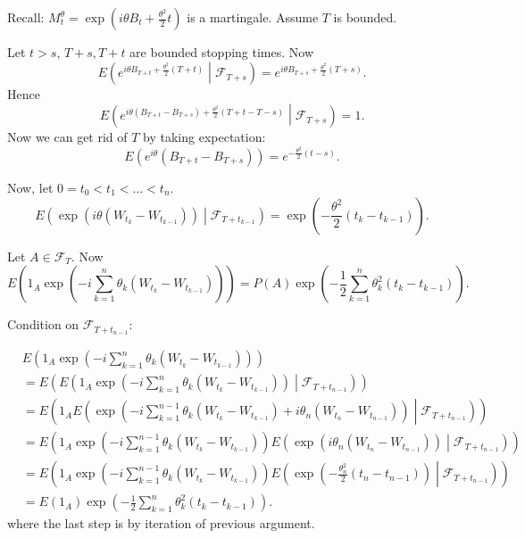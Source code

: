 Recall: $M_t^\theta = \exp\left( i \theta B_t + \frac{\theta^2}{2} t \right) $ is a martingale. Assume $T$ is bounded.

Let $t > s$,  $T+s, T+t$ are bounded stopping times. Now
\[
	E\left( e^{i \theta B_{T + t} + \frac{\theta^2}{2}(T + t)} \middle| \mathcal{F}_{T + s} \right) 
	= e^{i \theta B_{T + s} + \frac{\theta^2}{2} (T + s)}
.\] 
Hence
\[
	E\left( e^{i \theta (B_{T + t} - B_{T + s}) + \frac{\theta^2}{2}(T + t - T - s)} \middle| \mathcal{F}_{T + s} \right) =1
.\] 
Now we can get rid of $T$ by taking expectation:
\[
	E\left( e^{i \theta} \left( B_{T + t} - B_{T + s} \right)  \right) = e^{- \frac{\theta^2}{2} (t - s)}
.\] 


Now, let $0 = t_0 < t_1 < \ldots < t_n$. 
\[
	E\left( \exp\left( i \theta \left( W_{t_k} - W_{t_{k-1}}  \right)  \right)  \middle| \mathcal{F}_{T + t_{k - 1}} \right) 
	= \exp\left( - \frac{\theta^2}{2}\left( t_k - t_{k-1} \right)  \right) 
.\] 

Let $A \in \mathcal{F}_{T}$. Now
\[
	E\left( 1_A \exp\left( -i \sum_{k=1}^{n} \theta_k \left( W_{t_k} - W_{t_{k-1}} \right)  \right)  \right) 
	= P(A) \exp\left( - \frac{1}{2} \sum_{k=1}^{n} \theta_k^2 \left( t_k - t_{k-1} \right)  \right) 
.\] 

Condition on $\mathcal{F}_{T + t_{n-1}}$:

\begin{align*}
	&E\left( 1_A \exp\left( -i \sum_{k=1}^{n} \theta_k \left( W_{t_k} - W_{t_{k-1}} \right)  \right)  \right) \\
	&= E\left(E\left( 1_A \exp\left( -i \sum_{k=1}^{n} \theta_k \left( W_{t_k} - W_{t_{k-1}} \right)  \right) \middle| \mathcal{F}_{T + t_{n-1}} \right) \right)\\
	&= E\left(1_A E\left( \exp\left( -i \sum_{k=1}^{n-1} \theta_k \left( W_{t_k} - W_{t_{k-1}} \right)  + i \theta_n \left( W_{t_n} - W_{t_{n-1}} \right)  \right) \middle| \mathcal{F}_{T + t_{n-1}} \right) \right)\\
	&= E\left(1_A \exp\left( -i \sum_{k=1}^{n-1} \theta_k \left( W_{t_k} - W_{t_{k-1}} \right) \right) E\left( \exp\left(  i \theta_n \left( W_{t_n} - W_{t_{n-1}} \right)  \right) \middle| \mathcal{F}_{T + t_{n-1}} \right) \right)\\
	&= E\left(1_A \exp\left( -i \sum_{k=1}^{n-1} \theta_k \left( W_{t_k} - W_{t_{k-1}} \right) \right) E\left( \exp\left( - \frac{\theta^2_n}{2} (t_n - t_{n-1}) \right)  \middle| \mathcal{F}_{T + t_{n-1}} \right) \right)\\
	&= E(1_A) \exp\left( - \frac{1}{2} \sum_{k=1}^{n} \theta_k^2 (t_k - t_{k-1}) \right) 
.\end{align*} 
where the last step is by iteration of previous argument.

